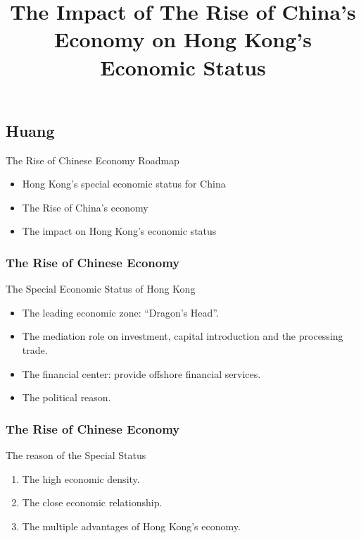 \documentclass[slidestop,uncompress,mathsans, 12pt]{beamer}
\begin{document}
\subsection{Huang}
\begin{frame}
\title {The Impact of The Rise of China's Economy on Hong Kong's Economic Status}
\date{}
\titlepage
\end{frame}
\begin{frame}{The Rise of Chinese Economy}
Roadmap\\
\begin{itemize}
\item Hong Kong's special economic status for China\\
\item The Rise of China's economy\\
\item The impact on Hong Kong's economic status\\

\end{itemize}

\end{frame}
\begin{frame}
\frametitle{The Rise of Chinese Economy}
The Special Economic Status of Hong Kong\\
\bigskip
{}%
\begin{itemize}[<+->]
\item The leading economic zone: “Dragon's Head”.
\item The mediation role on investment, capital introduction and the processing trade.
\item The financial center: provide offshore financial services.
\item The political reason.
\end{itemize}
\pause
\end{frame}

\begin{frame}
\frametitle{The Rise of Chinese Economy}
The reason of the Special Status\\
\bigskip
\begin{enumerate}[A]
\item The high economic density.
\bigskip
\item The close economic relationship.
\bigskip
\item The multiple advantages of Hong Kong's economy.
\end{enumerate}
\end{frame}
\end{document}
